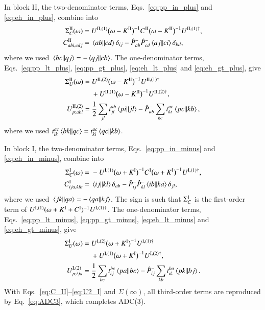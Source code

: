 \documentclass[aip,jcp,reprint,noshowkeys,superscriptaddress]{revtex4-1}
\begin{document}
In block II, the two-denominator terms,
Eqs.~\eqref{eq:pp_in_plus} and \eqref{eq:eh_in_plus}, combine
into
\begin{align}
\Sigma^{\rm II}_{C}(\omega)
={}&
U^{{\rm II},(1)}\big(\omega-K^{\rm II}\big)^{-1}C^{\rm II}
\big(\omega-K^{\rm II}\big)^{-1}U^{{\rm II},(1)\dagger},
\nonumber\\
C^{\rm II}_{abi,cdj}
={}&
\mel{ab}{}{cd}\delta_{ij}
-\hat P^-_{ab}\hat P^-_{cd}\mel{aj}{}{ci}\delta_{bd},
\label{eq:C_II}
\end{align}
where we used $\mel{bc}{}{qj}=-\mel{qj}{}{cb}$.
The one-denominator terms,
Eqs.~\eqref{eq:pp_lt_plus}, \eqref{eq:pp_gt_plus},
\eqref{eq:eh_lt_plus} and \eqref{eq:eh_gt_plus}, give
\begin{align}
\Sigma^{\rm II}_{U}(\omega)
={}&
U^{{\rm II},(2)}\big(\omega-K^{\rm II}\big)^{-1}U^{{\rm II},(1)\dagger}
\nonumber\\
&+
U^{{\rm II},(1)}\big(\omega-K^{\rm II}\big)^{-1}U^{{\rm II},(2)\dagger},
\nonumber\\
U^{{\rm II},(2)}_{p;abi}
={}&
\frac12\sum_{jl}t_{jl}^{ab}\mel{pi}{}{jl}
-\hat P^-_{ab}\sum_{kc}t_{ki}^{ac}\mel{pc}{}{kb},
\label{eq:U2_II}
\end{align}
where we used $t_{ik}^{ac}\mel{bk}{}{qc}=t_{ki}^{ac}\mel{qc}{}{kb}$.

In block I, the two-denominator terms,
Eqs.~\eqref{eq:pp_in_minus} and \eqref{eq:eh_in_minus}, combine
into
\begin{align}
\Sigma^{\rm I}_{C}(\omega)
={}&
-U^{{\rm I},(1)}\big(\omega+K^{\rm I}\big)^{-1}C^{\rm I}
\big(\omega+K^{\rm I}\big)^{-1}U^{{\rm I},(1)\dagger},
\nonumber\\
C^{\rm I}_{ija,klb}
={}&
\mel{ij}{}{kl}\delta_{ab}
-\hat P^-_{ij}\hat P^-_{kl}\mel{ib}{}{ka}\delta_{jl},
\label{eq:C_I}
\end{align}
where we used $\mel{jk}{}{qa}=-\mel{qa}{}{kj}$.
The sign is such that $\Sigma^{\rm I}_{C}$ is the first-order term
of $U^{{\rm I},(1)}(\omega+K^{\rm I}+C^{\rm I})^{-1}U^{{\rm I},(1)\dagger}$.
The one-denominator terms,
Eqs.~\eqref{eq:pp_lt_minus}, \eqref{eq:pp_gt_minus},
\eqref{eq:eh_lt_minus} and \eqref{eq:eh_gt_minus}, give
\begin{align}
\Sigma^{\rm I}_{U}(\omega)
={}&
U^{{\rm I},(2)}\big(\omega+K^{\rm I}\big)^{-1}U^{{\rm I},(1)\dagger}
\nonumber\\
&+
U^{{\rm I},(1)}\big(\omega+K^{\rm I}\big)^{-1}U^{{\rm I},(2)\dagger},
\nonumber\\
U^{{\rm I},(2)}_{p;ija}
={}&
\frac12\sum_{bc}t_{ij}^{bc}\mel{pa}{}{bc}
-\hat P^-_{ij}\sum_{kb}t_{ik}^{ba}\mel{pk}{}{bj}.
\label{eq:U2_I}
\end{align}
With Eqs.~\eqref{eq:C_II}--\eqref{eq:U2_I} and $\Sigma(\infty)$, all
third-order terms are reproduced by Eq.~\eqref{eq:ADC3}, which
completes ADC(3).
\end{document}
